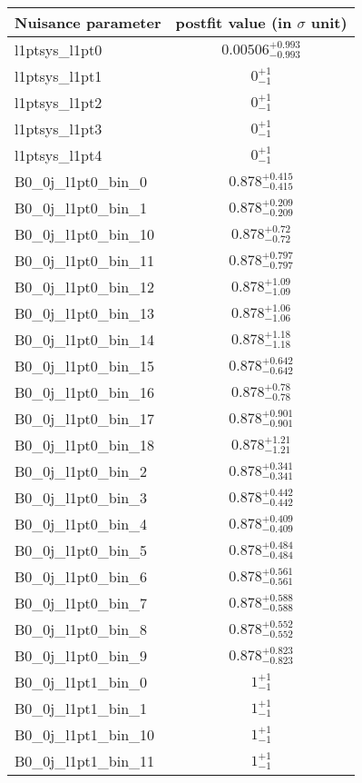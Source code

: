 
\begin{tabular}{|l|c|}
\hline
Nuisance parameter & postfit value (in $\sigma$ unit) \\\hline
l1ptsys\_l1pt0 & $0.00506^{+0.993}_{-0.993}$ \\
l1ptsys\_l1pt1 & $0^{+1}_{-1}$ \\
l1ptsys\_l1pt2 & $0^{+1}_{-1}$ \\
l1ptsys\_l1pt3 & $0^{+1}_{-1}$ \\
l1ptsys\_l1pt4 & $0^{+1}_{-1}$ \\
B0\_0j\_l1pt0\_bin\_0 & $0.878^{+0.415}_{-0.415}$ \\
B0\_0j\_l1pt0\_bin\_1 & $0.878^{+0.209}_{-0.209}$ \\
B0\_0j\_l1pt0\_bin\_10 & $0.878^{+0.72}_{-0.72}$ \\
B0\_0j\_l1pt0\_bin\_11 & $0.878^{+0.797}_{-0.797}$ \\
B0\_0j\_l1pt0\_bin\_12 & $0.878^{+1.09}_{-1.09}$ \\
B0\_0j\_l1pt0\_bin\_13 & $0.878^{+1.06}_{-1.06}$ \\
B0\_0j\_l1pt0\_bin\_14 & $0.878^{+1.18}_{-1.18}$ \\
B0\_0j\_l1pt0\_bin\_15 & $0.878^{+0.642}_{-0.642}$ \\
B0\_0j\_l1pt0\_bin\_16 & $0.878^{+0.78}_{-0.78}$ \\
B0\_0j\_l1pt0\_bin\_17 & $0.878^{+0.901}_{-0.901}$ \\
B0\_0j\_l1pt0\_bin\_18 & $0.878^{+1.21}_{-1.21}$ \\
B0\_0j\_l1pt0\_bin\_2 & $0.878^{+0.341}_{-0.341}$ \\
B0\_0j\_l1pt0\_bin\_3 & $0.878^{+0.442}_{-0.442}$ \\
B0\_0j\_l1pt0\_bin\_4 & $0.878^{+0.409}_{-0.409}$ \\
B0\_0j\_l1pt0\_bin\_5 & $0.878^{+0.484}_{-0.484}$ \\
B0\_0j\_l1pt0\_bin\_6 & $0.878^{+0.561}_{-0.561}$ \\
B0\_0j\_l1pt0\_bin\_7 & $0.878^{+0.588}_{-0.588}$ \\
B0\_0j\_l1pt0\_bin\_8 & $0.878^{+0.552}_{-0.552}$ \\
B0\_0j\_l1pt0\_bin\_9 & $0.878^{+0.823}_{-0.823}$ \\
B0\_0j\_l1pt1\_bin\_0 & $1^{+1}_{-1}$ \\
B0\_0j\_l1pt1\_bin\_1 & $1^{+1}_{-1}$ \\
B0\_0j\_l1pt1\_bin\_10 & $1^{+1}_{-1}$ \\
B0\_0j\_l1pt1\_bin\_11 & $1^{+1}_{-1}$ \\

\end{tabular}
